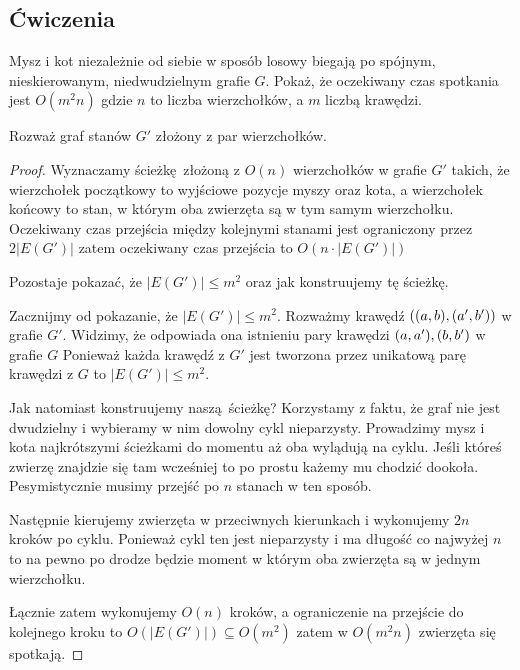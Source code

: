 \subsection{Ćwiczenia}

\begin{exercise}
    Mysz i kot niezależnie od siebie w sposób losowy biegają po spójnym, nieskierowanym, niedwudzielnym grafie \(G\).
    Pokaż, że oczekiwany czas spotkania jest \(O(m^2n)\) gdzie \(n\) to liczba wierzchołków, a \(m\) liczbą krawędzi.
    
    Rozważ graf stanów \(G'\) złożony z par wierzchołków.
\end{exercise}

\begin{proof}
    Wyznaczamy ścieżkę złożoną z \( O(n) \) wierzchołków w grafie \(G'\) takich, że wierzchołek początkowy 
    to wyjściowe pozycje myszy oraz kota, a wierzchołek końcowy to stan, w którym oba zwierzęta są w tym samym wierzchołku.
    Oczekiwany czas przejścia między kolejnymi stanami jest ograniczony przez \( 2|E(G')| \)
    zatem oczekiwany czas przejścia to \( O(n \cdot |E(G')|) \)
    
    Pozostaje pokazać, że \( |E(G')| \leq m^2 \) oraz jak konstruujemy tę ścieżkę.
    
    Zacznijmy od pokazanie, że \( |E(G')| \leq m^2 \).
    Rozważmy krawędź \( \pars{ \pars{a, b}, \pars{a', b'}} \) w grafie \( G' \).
    Widzimy, że odpowiada ona istnieniu pary krawędzi \( \pars{a, a'}, \pars{b, b'} \) w grafie \( G \)
    Ponieważ każda krawędź z \( G' \) jest tworzona przez unikatową parę krawędzi z \( G \)
    to \( |E(G')| \leq m^2 \).
    
    Jak natomiast konstruujemy naszą ścieżkę?
    Korzystamy z faktu, że graf nie jest dwudzielny i wybieramy w nim dowolny cykl nieparzysty.
    Prowadzimy mysz i kota najkrótszymi ścieżkami do momentu aż oba wylądują na cyklu. Jeśli któreś zwierzę
    znajdzie się tam wcześniej to po prostu każemy mu chodzić dookoła. Pesymistycznie musimy przejść po
    \( n \) stanach w ten sposób.
    
    Następnie kierujemy zwierzęta w przeciwnych kierunkach i wykonujemy \( 2n \) kroków po cyklu.
    Ponieważ cykl ten jest nieparzysty i ma długość co najwyżej \( n \) to na pewno po drodze będzie moment
    w którym oba zwierzęta są w jednym wierzchołku.
    
    Łącznie zatem wykonujemy \( O(n) \) kroków, a ograniczenie na przejście do kolejnego kroku to \( O(|E(G')|) \subseteq O(m^2) \) zatem w \( O(m^2n) \) zwierzęta się spotkają.
    
    
    
\end{proof}

